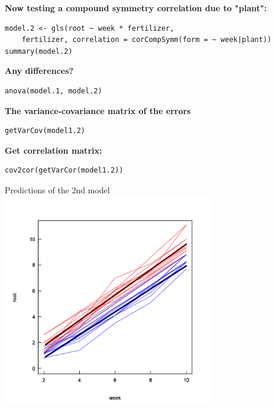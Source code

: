 \documentclass{beamer}
\begin{document}
\begin{frame}[fragile]{}
\begin{columns}
\begin{column}{0.5\textwidth}
        \end{column}
    \end{columns}
\end{frame}

\begin{frame}[fragile]{}
    \textbf{Now testing a compound symmetry correlation due to "plant":}
    \small
    \begin{verbatim}
model.2 <- gls(root ~ week * fertilizer, 
    fertilizer, correlation = corCompSymm(form = ~ week|plant))
summary(model.2)
    \end{verbatim}
    \tiny\scalebox{0.9}{
    
  } 
\end{frame}

 \begin{frame}[fragile]{}
     \textbf{Any differences?}
     \begin{verbatim}
anova(model.1, model.2)
     \end{verbatim}
     \tiny\scalebox{1.2}{
     
     } 
     \vspace{0.5cm}
     
     \normalsize\textbf{The variance-covariance matrix of the errors}
     \begin{verbatim}
getVarCov(model1.2)
     \end{verbatim}
     \tiny\scalebox{1.2}{
     
     } 
     \vspace{0.5cm}
     
     \normalsize\textbf{Get correlation matrix:}
     \begin{verbatim}
cov2cor(getVarCor(model1.2))
     \end{verbatim}
 \end{frame}

\begin{frame}[fragile]{Predictions of the 2nd model}
    \centering\includegraphics[width=0.7\textwidth]{lectures/day_4_GLS/figures/unnamed-chunk-39-1.png}
\end{frame}
\end{document}
